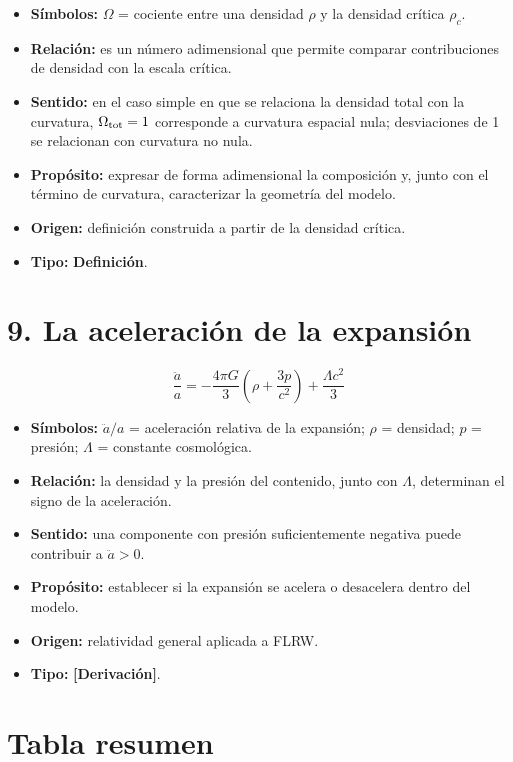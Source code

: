 \begin{itemize}
  \item \textbf{Símbolos:} $\Omega$ = cociente entre una densidad $\rho$ y la densidad crítica $\rho_c$.
  \item \textbf{Relación:} es un número adimensional que permite comparar contribuciones de densidad con la escala crítica.
  \item \textbf{Sentido:} en el caso simple en que se relaciona la densidad total con la curvatura, $\Omega_{\rm tot}=1$ corresponde a curvatura espacial nula; desviaciones de 1 se relacionan con curvatura no nula.
  \item \textbf{Propósito:} expresar de forma adimensional la composición y, junto con el término de curvatura, caracterizar la geometría del modelo.
  \item \textbf{Origen:} definición construida a partir de la densidad crítica.
  \item \textbf{Tipo:} \textbf{Definición}.
\end{itemize}

\section*{9. La aceleración de la expansión}

\[ \frac{\ddot a}{a}=-\frac{4\pi G}{3}\left(\rho+\frac{3p}{c^{2}}\right)+\frac{\Lambda c^{2}}{3} \]

\begin{itemize}
  \item \textbf{Símbolos:} $\ddot a/a$ = aceleración relativa de la expansión; $\rho$ = densidad; $p$ = presión; $\Lambda$ = constante cosmológica.
  \item \textbf{Relación:} la densidad y la presión del contenido, junto con $\Lambda$, determinan el signo de la aceleración.
  \item \textbf{Sentido:} una componente con presión suficientemente negativa puede contribuir a $\ddot a>0$.
  \item \textbf{Propósito:} establecer si la expansión se acelera o desacelera dentro del modelo.
  \item \textbf{Origen:} relatividad general aplicada a FLRW.
  \item \textbf{Tipo:} \textbf{[Derivación]}.
\end{itemize}

\section*{Tabla resumen}

